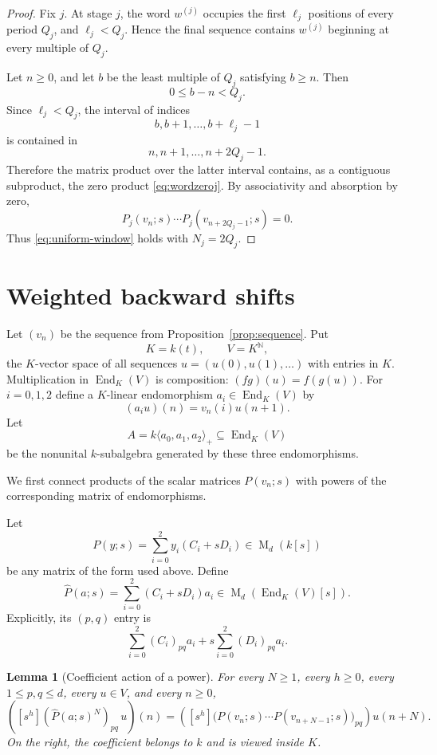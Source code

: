 \documentclass[11pt]{article}
\newtheorem{lemma}[theorem]{Lemma}
\newcommand{\NN}{\mathbb N}
\newcommand{\End}{\operatorname{End}}
\newcommand{\Mat}{\operatorname{M}}
\newcommand{\coeff}[2]{[s^{#1}]#2}
\begin{document}
\begin{proof}
Fix $j$.  At stage $j$, the word $w^{(j)}$ occupies the first $\ell_j$ positions of every period $Q_j$, and $\ell_j<Q_j$.  Hence the final sequence contains $w^{(j)}$ beginning at every multiple of $Q_j$.

Let $n\ge0$, and let $b$ be the least multiple of $Q_j$ satisfying $b\ge n$.  Then
\[
0\le b-n<Q_j.
\]
Since $\ell_j<Q_j$, the interval of indices
\[
b,b+1,\ldots,b+\ell_j-1
\]
is contained in
\[
n,n+1,\ldots,n+2Q_j-1.
\]
Therefore the matrix product over the latter interval contains, as a contiguous subproduct, the zero product \eqref{eq:wordzeroj}.  By associativity and absorption by zero,
\[
P_j(v_n;s)\cdots P_j(v_{n+2Q_j-1};s)=0.
\]
Thus \eqref{eq:uniform-window} holds with $N_j=2Q_j$.
\end{proof}

\section{Weighted backward shifts}\label{sec:shifts}

Let $(v_n)$ be the sequence from Proposition~\ref{prop:sequence}.  Put
\[
K=k(t),
\qquad
V=K^{\NN},
\]
the $K$-vector space of all sequences $u=(u(0),u(1),\ldots)$ with entries in $K$.  Multiplication in $\End_K(V)$ is composition: $(fg)(u)=f(g(u))$.
For $i=0,1,2$ define a $K$-linear endomorphism $a_i\in\End_K(V)$ by
\begin{equation}\label{eq:shift}
(a_i u)(n)=v_n(i)u(n+1).
\end{equation}
Let
\begin{equation}\label{eq:Adef}
A=k\langle a_0,a_1,a_2\rangle_+
\subseteq\End_K(V)
\end{equation}
be the nonunital $k$-subalgebra generated by these three endomorphisms.

We first connect products of the scalar matrices $P(v_n;s)$ with powers of the corresponding matrix of endomorphisms.

Let
\[
P(y;s)=\sum_{i=0}^2y_i(C_i+sD_i)\in\Mat_d(k[s])
\]
be any matrix of the form used above.  Define
\begin{equation}\label{eq:operator-pencil}
\widehat P(a;s)
=\sum_{i=0}^2(C_i+sD_i)a_i
\in\Mat_d(\End_K(V)[s]).
\end{equation}
Explicitly, its $(p,q)$ entry is
\[
\sum_{i=0}^2(C_i)_{pq}a_i
+s\sum_{i=0}^2(D_i)_{pq}a_i.
\]

\begin{lemma}[Coefficient action of a power]\label{lem:band}
For every $N\ge1$, every $h\ge0$, every $1\le p,q\le d$, every $u\in V$, and every $n\ge0$,
\begin{equation}\label{eq:bandidentity}
\left(\coeff{h}{(\widehat P(a;s)^N)_{pq}}\,u\right)(n)
=
\left(\coeff{h}{\bigl(P(v_n;s)\cdots P(v_{n+N-1};s)\bigr)_{pq}}\right)u(n+N).
\end{equation}
On the right, the coefficient belongs to $k$ and is viewed inside $K$.
\end{lemma}
\end{document}
